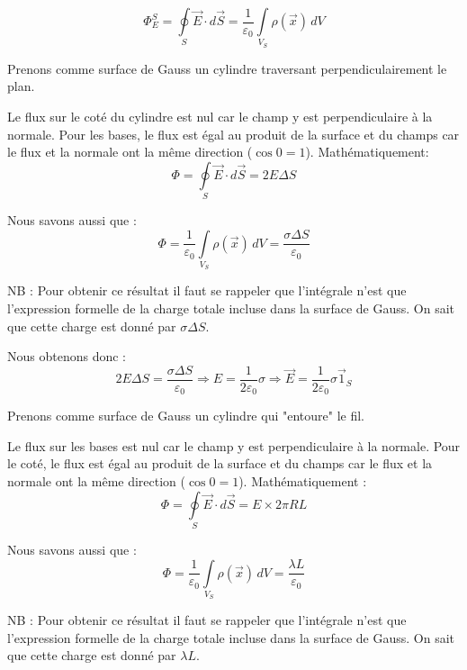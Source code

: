 \documentclass	[11pt, a4paper, openany]{book}
\begin{document}
		$$ \Phi^S_E = \oint \limits_S \vec E \cdot d \vec S = \dfrac{1}{\varepsilon_0} \int \limits_{V_S} \rho (\vec x) \, dV$$
			
			
		Prenons comme surface de Gauss un cylindre traversant perpendiculairement le plan.
			
		Le flux sur le coté du cylindre est nul car le champ y est perpendiculaire à la normale. Pour les bases, le flux est égal au produit de la surface et du champs car le flux et la normale ont la même direction ($\cos 0 = 1$). Mathématiquement: $$ \Phi = \oint \limits_S \vec E \cdot d \vec S = 2E\Delta S$$
			
		Nous savons aussi que : $$ \Phi =\dfrac{1}{\varepsilon_0} \int \limits_{V_S} \rho (\vec x) \, dV = \dfrac{\sigma \Delta S}{\varepsilon_0}$$
			
		NB : Pour obtenir ce résultat il faut se rappeler que l'intégrale n'est que l'expression formelle de la charge totale incluse dans la surface de Gauss. On sait que cette charge est donné par $\sigma \Delta S$.
			
		Nous obtenons donc : $$ 2E\Delta S = \dfrac{\sigma \Delta S}{\varepsilon_0} \Rightarrow E = \dfrac{1}{2\varepsilon_0}\sigma \Rightarrow \vec E = \dfrac{1}{2\varepsilon_0}\sigma \vec 1_S$$
			
			
		Prenons comme surface de Gauss un cylindre qui "entoure" le fil.
			
		Le flux sur les bases est nul car le champ y est perpendiculaire à la normale. Pour le coté, le flux est égal au produit de la surface et du champs car le flux et la normale ont la même direction ($\cos 0 = 1$). Mathématiquement : $$ \Phi = \oint \limits_S \vec E \cdot d \vec S = E\times 2\pi RL $$
			
		Nous savons aussi que : $$ \Phi =\dfrac{1}{\varepsilon_0} \int \limits_{V_S} \rho (\vec x) \, dV = \dfrac{\lambda L}{\varepsilon_0}$$
			
		NB : Pour obtenir ce résultat il faut se rappeler que l'intégrale n'est que l'expression formelle de la charge totale incluse dans la surface de Gauss. On sait que cette charge est donné par $\lambda L$.
			
\end{document}
